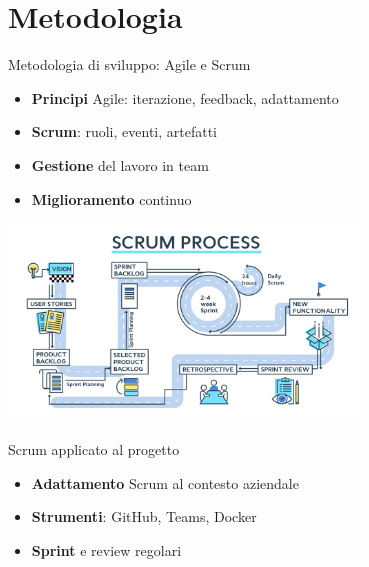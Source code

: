 \documentclass{beamer}
\begin{document}
\section{Metodologia}
\begin{frame}{Metodologia di sviluppo: Agile e Scrum}
    \begin{itemize}
        \item \textbf{Principi} Agile: iterazione, feedback, adattamento
        \item \textbf{Scrum}: ruoli, eventi, artefatti
        \item \textbf{Gestione} del lavoro in team
        \item \textbf{Miglioramento} continuo
    \end{itemize}
    \begin{center}
    \includegraphics[width=0.7\textwidth]{images/Scrum/scrum-process.jpg}
    \end{center}
\end{frame}

\begin{frame}{Scrum applicato al progetto}
    \begin{itemize}
        \item \textbf{Adattamento} Scrum al contesto aziendale
        \item \textbf{Strumenti}: GitHub, Teams, Docker
        \item \textbf{Sprint} e review regolari
    \end{itemize}
\end{frame}

\end{document}
